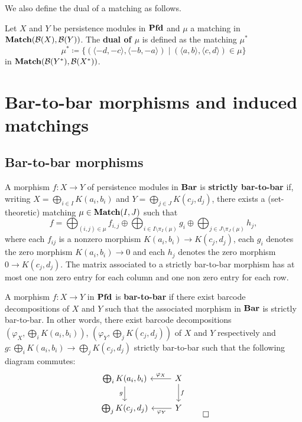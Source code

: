 We also define the dual of a matching as follows.

\begin{definition}
Let $X$ and $Y$ be persistence modules in $\Pfd$ and $\mu$ a matching in $\Match(\cc{B}(X), \cc{B}(Y))$. The \textbf{dual of $\mu$} is defined as the matching $\mu^*$
\[
  \mu^* \coloneq \{ (\langle -d, -c \rangle, \langle -b, -a \rangle) \mid (\langle a, b \rangle, \langle c, d \rangle) \in \mu \}
\]
in $\Match(\cc{B}(Y^*), \cc{B}(X^*))$.
\end{definition}

\section{Bar-to-bar morphisms and induced matchings}
\label{C!S:btb}

\subsection{Bar-to-bar morphisms}

\begin{definition}
\label{C!D:btb}
  A morphism $f \colon X \to Y$ of persistence modules in $\Bar$ is \textbf{strictly bar-to-bar}
  if, writing $X = \bigoplus_{i \in I} K(a_i, b_i)$ and $Y = \bigoplus_{j \in J} K(c_j, d_j)$, there exists a (set-theoretic) matching $\mu \in \Match(I, J)$ such that
  \begin{equation}
  \label{C!eq:btb}
    f = \bigoplus_{(i, j) \in \mu} f_{i, j} \oplus \bigoplus_{i \in I \setminus \pi_I(\mu)} g_i \oplus \bigoplus_{j \in J \setminus \pi_J(\mu)} h_j , 
  \end{equation}
  where each $f_{ij}$ is a nonzero morphism $K(a_i, b_i) \to K(c_j, d_j)$, each $g_i$ denotes the zero morphism $K(a_i, b_i) \to 0$ and each $h_j$ denotes the zero morphism $0 \to K(c_j, d_j)$. The matrix associated to a strictly bar-to-bar morphism has at most one non zero entry for each column and one non zero entry for each row.

  A morphism $f \colon X \to Y$ in $\Pfd$ is \textbf{bar-to-bar} if there exist barcode decompositions of $X$ and $Y$ such that the associated morphism in $\Bar$ is strictly bar-to-bar. In other words, there exist barcode decompositions $(\varphi_X,\bigoplus_i K(a_i,b_i))$, $(\varphi_Y,\bigoplus_j K(c_j,d_j))$ of $X$ and $Y$ respectively and $g \colon \bigoplus_i K(a_i,b_i) \rightarrow \bigoplus_j K(c_j,d_j)$ strictly bar-to-bar such that the following diagram commutes:
  \[
    \begin{tikzcd}[baseline=default]
      \bigoplus_i K(a_i, b_i) \arrow[d, "g"']
      & X \arrow[d, "f"]  \arrow[l, "\varphi_X"'] \\
      \bigoplus_j K(c_j, d_j)
      & Y  \arrow[l, "\varphi_Y"]
    \end{tikzcd}
    \qedhere
  \]
\end{definition}

